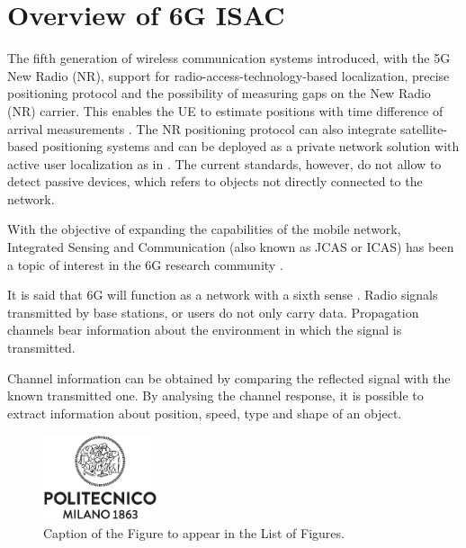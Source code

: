 \chapter{Overview of 6G ISAC}

The fifth generation of wireless communication systems introduced, with the 5G New Radio (NR), support for radio-access-technology-based localization, precise positioning protocol and the possibility of measuring gaps on the New Radio (NR) carrier. This enables the UE to estimate positions with time difference of arrival measurements \cite{Keating_Saily_Hulkkonen_Karjalainen_2019} . \newline
The NR positioning protocol can also integrate satellite-based positioning systems and can be deployed as a private network solution with active user localization as in \cite{Henninger_Abrudan_Mandelli_Arnold_Saur_Kolmonen_Klein_Schlitter_Brink_2022}.
The current standards, however, do not allow to detect passive devices, which refers to objects not directly connected to the network.

With the objective of expanding the capabilities of the mobile network, Integrated Sensing and Communication (also known as JCAS or ICAS) has been a topic of interest in the 6G research community \cite{Mandelli_Henninger_Bauhofer_Wild_2023}. 

It is said that 6G will function as a network with a sixth sense \cite{Viswanathan_Wild_2021}. Radio signals transmitted by base stations, or users do not only carry data. Propagation channels bear information about the environment in which the signal is transmitted. 

Channel information can be obtained by comparing the reflected signal with the known transmitted one. By analysing the channel response, it is possible to extract information about position, speed, type and shape of an object.

\begin{figure}[H]
	\centering
	\includegraphics[width=0.3\textwidth]{Images/logo_polimi_scritta.eps}
	\caption{Caption of the Figure to appear in the List of Figures.}
	\label{fig:ISAC-scheme}
\end{figure}



